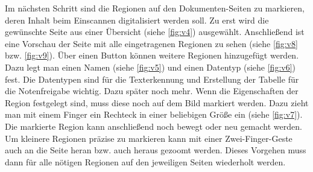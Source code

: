 \documentclass[notables, nomenclature, oneside, 150]{HSMW-Thesis}
\begin{document}
			Im nächsten Schritt sind die Regionen auf den Dokumenten-Seiten zu markieren, deren Inhalt beim Einscannen digitalisiert werden soll. Zu erst wird die gewünschte Seite aus einer Übersicht (siehe \ref{fig:v4}) ausgewählt. Anschließend ist eine Vorschau der Seite mit alle eingetragenen Regionen zu sehen (siehe \ref{fig:v8} bzw. \ref{fig:v9}). Über einen Button können weitere Regionen hinzugefügt werden. Dazu legt man einen Namen (siehe \ref{fig:v5}) und einen Datentyp (siehe \ref{fig:v6}) fest. Die Datentypen sind für die Texterkennung und Erstellung der Tabelle für die Notenfreigabe wichtig. Dazu später noch mehr. Wenn die Eigenschaften der Region festgelegt sind, muss diese noch auf dem Bild markiert werden. Dazu zieht man mit einem Finger ein Rechteck in einer beliebigen Größe ein (siehe \ref{fig:v7}). Die markierte Region kann anschließend noch bewegt oder neu gemacht werden. Um kleinere Regionen präzise zu markieren kann mit einer Zwei-Finger-Geste auch an die Seite heran bzw. auch heraus gezoomt werden. Dieses Vorgehen muss dann für alle nötigen Regionen auf den jeweiligen Seiten wiederholt werden. 
			
\end{document}
